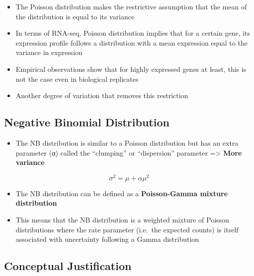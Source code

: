 \documentclass[
]{book}
\providecommand{\tightlist}{%
  \setlength{\itemsep}{0pt}\setlength{\parskip}{0pt}}
\begin{document}
\begin{itemize}
\tightlist
\item
  The Poisson distribution makes the restrictive assumption that the mean of the distribution is equal to its variance
\item
  In terms of RNA-seq, Poisson distribution implies that for a certain gene, its expression profile follows a distribution with a mean expression equal to the variance in expression
\item
  Empirical observations show that for highly expressed genes at least, this is not the case even in biological replicates
\item
  Another degree of variation that removes this restriction
\end{itemize}

\hypertarget{negative-binomial-distribution}{%
\subsection{Negative Binomial Distribution}\label{negative-binomial-distribution}}

\begin{itemize}
\tightlist
\item
  The NB distribution is similar to a Poisson distribution but has an extra parameter (α) called the ``clumping'' or ``dispersion'' parameter =\textgreater{} \textbf{More variance}
\end{itemize}

\[\sigma^2=\mu+\alpha\mu^2\]

\begin{itemize}
\tightlist
\item
  The NB distribution can be defined as a \textbf{Poisson-Gamma mixture distribution}
\item
  This means that the NB distribution is a weighted mixture of Poisson distributions where the rate parameter (i.e.~the expected counts) is itself associated with uncertainty following a Gamma distribution
\end{itemize}

\hypertarget{conceptual-justification}{%
\subsection{Conceptual Justification}\label{conceptual-justification}}
\end{document}
